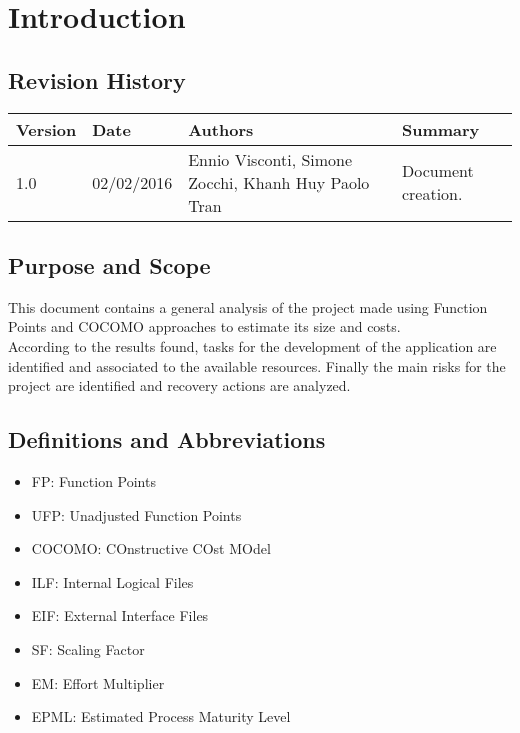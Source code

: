 \section{Introduction}

\subsection{Revision History}
{\renewcommand{\arraystretch}{1.5}
\begin{tabularx}{\textwidth}{|l|l|X|l|}
    \hline 
    \textbf{Version} & \textbf{Date} & \textbf{Authors} & \textbf{Summary}\\ 
    \hline 
    
    1.0 & 02/02/2016 & Ennio Visconti, Simone Zocchi, Khanh Huy Paolo Tran & Document creation.\\
    \hline 
\end{tabularx}}

\subsection{Purpose and Scope}
This document contains a general analysis of the project made using Function Points and COCOMO approaches to estimate its size and costs. \\
According to the results found, tasks for the development of the application are identified and associated to the available resources. Finally the main risks for the project are identified and recovery actions are analyzed.

\subsection{Definitions and Abbreviations}
\begin{itemize}
    \item FP: Function Points
    \item UFP: Unadjusted Function Points
    \item COCOMO: COnstructive COst MOdel
    \item ILF: Internal Logical Files
    \item EIF: External Interface Files
    \item SF: Scaling Factor
    \item EM: Effort Multiplier
    \item EPML: Estimated Process Maturity Level
\end{itemize}

